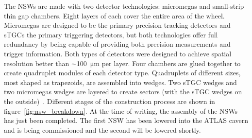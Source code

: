 The NSWs are made with two detector technologies: micromegas and small-strip thin gap chambers. Eight layers of each cover the entire area of the wheel. Micromegas are designed to be the primary precision tracking detectors and sTGCs the primary triggering detectors, but both technologies offer full redundancy by being capable of providing both precision measurements and trigger information. Both types of detectors were designed to achieve spatial resolution better than $\sim$\SI{100}{\micro\meter} per layer. Four chambers are glued together to create quadruplet modules of each detector type. Quadruplets of different sizes, most shaped as trapezoids, are assembled into wedges. Two sTGC wedges and two micromegas wedges are layered to create sectors (with the sTGC wedges on the outside)~\cite{nsw_tdr}. Different stages of the construction process are shown in figure~\ref{fig:nsw_breakdown}. At the time of writing, the assembly of the NSWs has just been completed. The first NSW has been lowered into the ATLAS cavern and is being commissioned and the second will be lowered shortly. 

